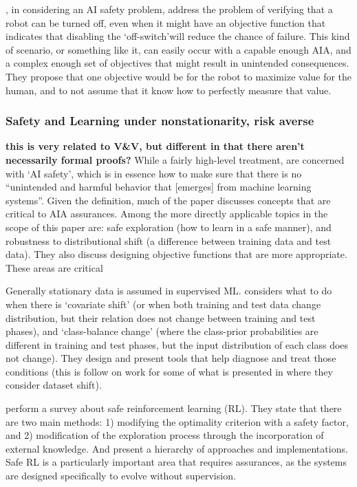     \citet{Hadfield-Menell2016-ws}, in considering an AI safety problem, address the problem of verifying that a robot can be turned off, even when it might have an objective function that indicates that disabling the `off-switch'will reduce the chance of failure. This kind of scenario, or something like it, can easily occur with a capable enough AIA, and a complex enough set of objectives that might result in unintended consequences. They propose that one objective would be for the robot to maximize value for the human, and to not assume that it know how to perfectly measure that value.

\subsubsection{Safety and Learning under nonstationarity, risk averse} \textbf{this is very related to V\&V, but different in that there aren't necessarily formal proofs?}
    While a fairly high-level treatment, \citet{Amodei2016-xi} are concerned with `AI safety', which is in essence how to make sure that there is no ``unintended and harmful behavior that [emerges] from machine learning systems''. Given the definition, much of the paper discusses concepts that are critical to AIA assurances. Among the more directly applicable topics in the scope of this paper are: safe exploration (how to learn in a safe manner), and robustness to distributional shift (a difference between training data and test data). They also discuss designing objective functions that are more appropriate. These areas are critical 

    Generally stationary data is assumed in supervised ML. \citet{Sugiyama2013-ci} considers what to do when there is `covariate shift' (or when both training and test data change distribution, but their relation does not change between training and test phases), and `class-balance change' (where the class-prior probabilities are different in training and test phases, but the input distribution of each class does not change). They design and present tools that help diagnose and treat those conditions (this is follow on work for some of what is presented in \citet{Quinonero-Candela2009-fj} where they consider dataset shift). 

    \citet{Garcia2015-rs} perform a survey about safe reinforcement learning (RL). They state that there are two main methods: 1) modifying the optimality criterion with a safety factor, and 2) modification of the exploration process through the incorporation of external knowledge. And present a hierarchy of approaches and implementations. Safe RL is a particularly important area that requires assurances, as the systems are designed specifically to evolve without supervision.

